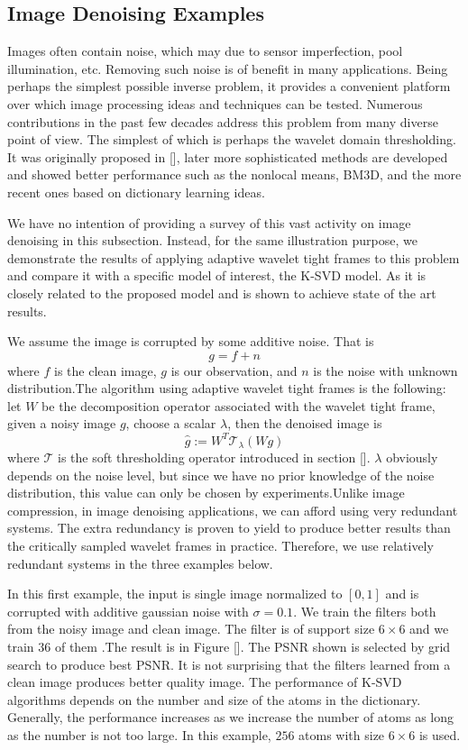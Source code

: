\documentclass[a4paper]{article}
\begin{document}
\subsection{Image Denoising Examples}
Images often contain noise, which may due to sensor imperfection, pool illumination, etc. Removing such noise is of benefit in many applications. Being perhaps the simplest possible inverse problem, it provides a convenient platform over which image processing ideas and techniques can be tested. Numerous contributions in the past few decades address this problem from many diverse point of view. The simplest of which is perhaps the wavelet domain thresholding.  It was originally proposed in [], later more sophisticated methods are developed and showed better performance such as the nonlocal means, BM3D, and the more recent ones based on dictionary learning ideas. 

We have no intention of providing a survey of this vast activity on image denoising in this subsection. Instead, for the same illustration purpose, we demonstrate the results of applying adaptive wavelet tight frames to this problem and compare it with a specific model of interest, the K-SVD model. As it is closely related to the proposed model and is shown to achieve state of the art results.

We assume the image is corrupted by some additive noise. That is 
\[
g=f+n
\]
where $f$ is the clean image, $g$ is our observation, and $n$ is the noise with unknown distribution.The algorithm using adaptive wavelet tight frames is the following: let $W$ be the decomposition operator associated with the wavelet tight frame, given a noisy image $g$, choose a scalar $\lambda$, then the denoised image is
\[
\hat{g} :=W^T \mathcal{T}_{\lambda} (Wg)
\]
where $\mathcal{T}$ is the soft thresholding operator introduced in section []. $\lambda$ obviously depends on the noise level, but since we have no prior knowledge of the noise distribution, this value can only be chosen by experiments.Unlike image compression, in image denoising applications, we can afford using very redundant systems. The extra redundancy is proven to yield to produce better results than the critically sampled wavelet frames in practice. Therefore, we use relatively redundant systems in the three examples below.

In this first example, the input is single image normalized to $[0,1]$ and is corrupted with additive gaussian noise with $\sigma=0.1$. We train the filters both from the noisy image and clean image. The filter is of support size $6\times 6$ and we train $36$ of them .The result is in Figure [].  The PSNR shown is selected by grid search to produce best PSNR. It is not surprising that the filters learned from a clean image produces better quality image. The performance of K-SVD algorithms depends on the number and size of the atoms in the dictionary. Generally, the performance increases as we increase the number of atoms as long as the number is not too large. In this example, $256$ atoms with size $6\times 6$ is used.
\end{document}
